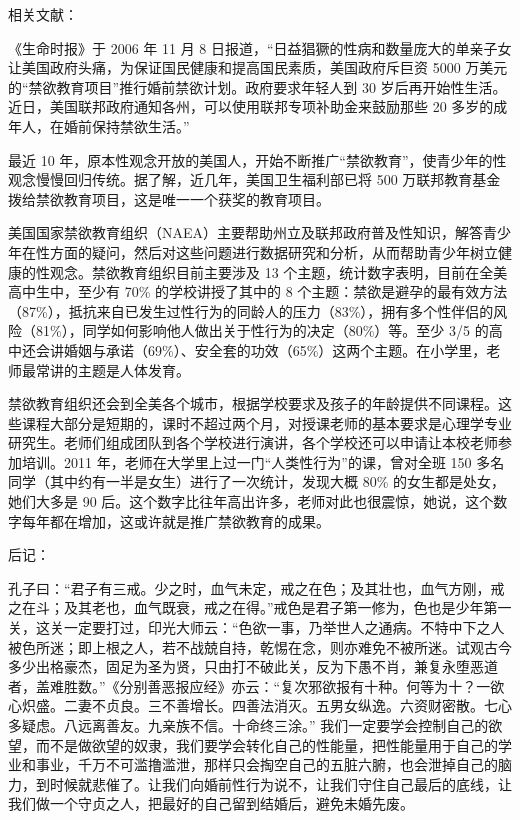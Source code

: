 \documentclass{ctexart}
\begin{document}
相关文献：

《生命时报》于 2006 年 11 月 8 日报道，“日益猖獗的性病和数量庞大的单亲子女让美国政府头痛，为保证国民健康和提高国民素质，美国政府斥巨资 5000 万美元的“禁欲教育项目”推行婚前禁欲计划。政府要求年轻人到 30 岁后再开始性生活。近日，美国联邦政府通知各州，可以使用联邦专项补助金来鼓励那些 20 多岁的成年人，在婚前保持禁欲生活。”

最近 10 年，原本性观念开放的美国人，开始不断推广“禁欲教育”，使青少年的性观念慢慢回归传统。据了解，近几年，美国卫生福利部已将 500 万联邦教育基金拨给禁欲教育项目，这是唯一一个获奖的教育项目。

美国国家禁欲教育组织（NAEA）主要帮助州立及联邦政府普及性知识，解答青少年在性方面的疑问，然后对这些问题进行数据研究和分析，从而帮助青少年树立健康的性观念。禁欲教育组织目前主要涉及 13 个主题，统计数字表明，目前在全美高中生中，至少有 70\% 的学校讲授了其中的 8 个主题：禁欲是避孕的最有效方法（87\%），抵抗来自已发生过性行为的同龄人的压力（83\%），拥有多个性伴侣的风险（81\%），同学如何影响他人做出关于性行为的决定（80\%）等。至少 3/5 的高中还会讲婚姻与承诺（69\%）、安全套的功效（65\%）这两个主题。在小学里，老师最常讲的主题是人体发育。

禁欲教育组织还会到全美各个城市，根据学校要求及孩子的年龄提供不同课程。这些课程大部分是短期的，课时不超过两个月，对授课老师的基本要求是心理学专业研究生。老师们组成团队到各个学校进行演讲，各个学校还可以申请让本校老师参加培训。2011 年，老师在大学里上过一门“人类性行为”的课，曾对全班 150 多名同学（其中约有一半是女生）进行了一次统计，发现大概 80\% 的女生都是处女，她们大多是 90 后。这个数字比往年高出许多，老师对此也很震惊，她说，这个数字每年都在增加，这或许就是推广禁欲教育的成果。

后记：

孔子曰：“君子有三戒。少之时，血气未定，戒之在色；及其壮也，血气方刚，戒之在斗；及其老也，血气既衰，戒之在得。”戒色是君子第一修为，色也是少年第一关，这关一定要打过，印光大师云：“色欲一事，乃举世人之通病。不特中下之人被色所迷；即上根之人，若不战兢自持，乾惕在念，则亦难免不被所迷。试观古今多少出格豪杰，固足为圣为贤，只由打不破此关，反为下愚不肖，兼复永堕恶道者，盖难胜数。”《分别善恶报应经》亦云：“复次邪欲报有十种。何等为十？一欲心炽盛。二妻不贞良。三不善增长。四善法消灭。五男女纵逸。六资财密散。七心多疑虑。八远离善友。九亲族不信。十命终三涂。” 我们一定要学会控制自己的欲望，而不是做欲望的奴隶，我们要学会转化自己的性能量，把性能量用于自己的学业和事业，千万不可滥撸滥泄，那样只会掏空自己的五脏六腑，也会泄掉自己的脑力，到时候就悲催了。让我们向婚前性行为说不，让我们守住自己最后的底线，让我们做一个守贞之人，把最好的自己留到结婚后，避免未婚先废。
\end{document}
